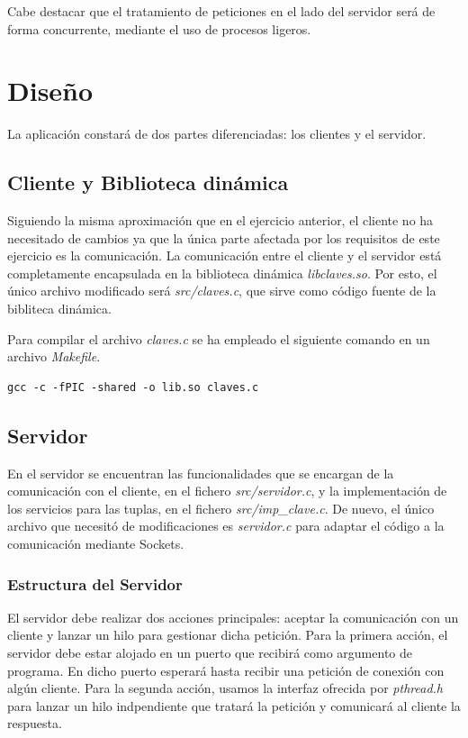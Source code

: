 \documentclass[]{article}
\begin{document}
Cabe destacar que el tratamiento de peticiones en el lado del servidor será de forma concurrente, mediante el uso de procesos ligeros. 

\section{Diseño}
\label{sec:disenno}
La aplicación constará de dos partes diferenciadas: los clientes y el servidor.

\subsection{Cliente y Biblioteca dinámica}
\label{subsec:cliente_biblioteca}
Siguiendo la misma aproximación que en el ejercicio anterior, el cliente no ha necesitado de cambios ya que la única parte afectada por los requisitos de este ejercicio es la comunicación. La comunicación entre el cliente y el servidor está completamente encapsulada en la biblioteca dinámica \textit{libclaves.so}. Por esto, el único archivo modificado será \textit{src/claves.c}, que sirve como código fuente de la bibliteca dinámica.

Para compilar el archivo \textit{claves.c} se ha empleado el siguiente comando en un archivo \textit{Makefile}.

\begin{center}
\begin{lstlisting}[caption=Compiación de biblioteca dinámica]
gcc -c -fPIC -shared -o lib.so claves.c
\end{lstlisting}
\end{center}

\subsection{Servidor}
\label{subsec:servidor}
En el servidor se encuentran las funcionalidades que se encargan de la comunicación con el cliente, en el fichero \textit{src/servidor.c}, y la implementación de los servicios para las tuplas, en el fichero \textit{src/imp\_clave.c}. De nuevo, el único archivo que necesitó de modificaciones es \textit{servidor.c} para adaptar el código a la comunicación mediante Sockets. 

\subsubsection{Estructura del Servidor}
\label{subsec::estructura_servidor}
El servidor debe realizar dos acciones principales: aceptar la comunicación con un cliente y lanzar un hilo para gestionar dicha petición. Para la primera acción, el servidor debe estar alojado en un puerto que recibirá como argumento de programa. En dicho puerto esperará hasta recibir una petición de conexión con algún cliente. Para la segunda acción, usamos la interfaz ofrecida por \textit{pthread.h} para lanzar un hilo indpendiente que tratará la petición y comunicará al cliente la respuesta. 
\end{document}
